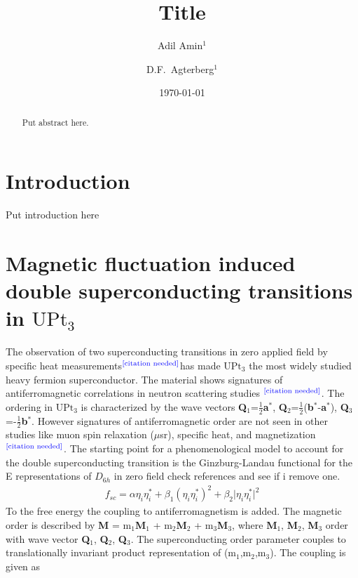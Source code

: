 \documentclass[prl,notitlepage,aps]{revtex4-1}
\newcommand{\cn}{$^\text{\color{blue}[citation needed]}$}
\begin{document}
\title{Title}
\author{Adil Amin$^1$}
\author{D.F.~Agterberg$^1$}
\date{\today}

\begin{abstract}
Put abstract here.
\end{abstract}

\maketitle
\section{Introduction}
\label{sec:intro}
Put introduction here
\section{Magnetic fluctuation induced double superconducting transitions in  $\text{UPt}_3$}
\label{UPt3}
The observation of two superconducting transitions in zero applied field by specific heat measurements\cn has made $\text{UPt}_3$ the most widely studied heavy fermion superconductor. The material shows signatures of antiferromagnetic correlations in  neutron scattering studies \cn. The ordering  in $\text{UPt}_3$ is characterized by the wave vectors \textbf{Q}$_1$=$\frac{1}{2}$\textbf{a}$^*$, \textbf{Q}$_2$=$\frac{1}{2}$(\textbf{b}$^*$-\textbf{a}$^*$), \textbf{Q}$_3$=-$\frac{1}{2}$\textbf{b}$^*$. However signatures of antiferromagnetic order are not seen in other studies like muon spin relaxation ($\mu$sr), specific heat, and magnetization\cn.     
The starting point for a phenomenological model to account for the double superconducting transition is the Ginzburg-Landau functional for the E representations of $D_{6h}$ in zero field \cite{1989JPSJ...58.4116M}\cite{1989JPCM....1.8135H}\cite{1989JPSJ...58.2244M} {\color{red} check references and see if i remove one}. 
\begin{align}
f_{sc} = \alpha\eta_i\eta_i^*+\beta_1\left(\eta_i\eta_i^*\right)^2+ \beta_2\lvert\eta_i\eta_i^*\rvert^2
\end{align}
To the free energy the coupling to antiferromagnetism is added. The magnetic order is described by \textbf{M} = m$_1$\textbf{M}$_1$ + m$_2$\textbf{M}$_2$ + m$_3$\textbf{M}$_3$, where \textbf{M}$_1$, \textbf{M}$_2$, \textbf{M}$_3$ order with wave vector \textbf{Q}$_1$, \textbf{Q}$_2$, \textbf{Q}$_3$. The superconducting order parameter couples to translationally invariant product representation of (m$_1$,m$_2$,m$_3$). The coupling is given as \cite{1989JPSJ...58.2244M}
\end{document}
